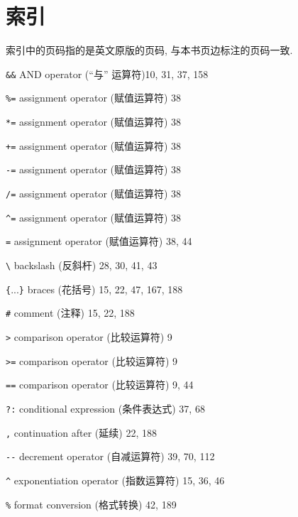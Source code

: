 \chapter{索引}
\label{chap:index}

索引中的页码指的是英文原版的页码, 与本书页边标注的页码一致.

\begin{multicols}{3}
\small
\hangindent=3pc  \verb'&&' AND operator (``与'' 运算符)10, 31, 37, 158

\hangindent=3pc  \verb'%=' assignment operator (赋值运算符) 38

\hangindent=3pc  \verb'*=' assignment operator (赋值运算符) 38

\hangindent=3pc  \verb'+=' assignment operator (赋值运算符) 38

\hangindent=3pc  \verb'-=' assignment operator (赋值运算符) 38

\hangindent=3pc  \verb'/=' assignment operator (赋值运算符) 38

\hangindent=3pc  \verb'^=' assignment operator (赋值运算符) 38

\hangindent=3pc  \verb'=' assignment operator (赋值运算符) 38, 44

\hangindent=3pc  \verb'\' backslash (反斜杆) 28, 30, 41, 43

\hangindent=3pc  \verb'{'...\verb'}' braces (花括号) 15, 22, 47, 167, 188

\hangindent=3pc  \verb'#' comment (注释) 15, 22, 188

\hangindent=3pc  \verb'>' comparison operator (比较运算符) 9

\hangindent=3pc  \verb'>=' comparison operator (比较运算符) 9

\hangindent=3pc  \verb'==' comparison operator (比较运算符) 9, 44

\hangindent=3pc  \verb'?:' conditional expression (条件表达式) 37, 68

\hangindent=3pc  \verb',' continuation after (延续) 22, 188

\hangindent=3pc  \verb'--' decrement operator (自减运算符) 39, 70, 112

\hangindent=3pc  \verb'^' exponentiation operator (指数运算符) 15, 36, 46

\hangindent=3pc  \verb'%' format conversion (格式转换) 42, 189


\end{multicols}

